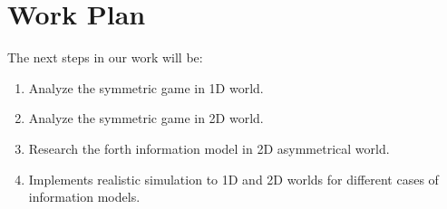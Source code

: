 \documentclass[a4paper,english,10pt]{article}
\begin{document}
\section{Work Plan}
The next steps in our work will be:
\begin{enumerate}
\item Analyze the symmetric game in 1D world.
\item Analyze the symmetric game in 2D world.
\item Research the forth information model in 2D asymmetrical world.
\item Implements realistic simulation to 1D and 2D worlds for different cases of information models.
\end{enumerate}




\end{document}
